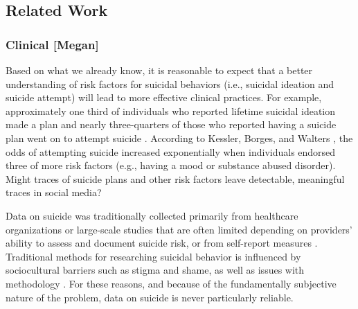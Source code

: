 \documentclass[11pt]{article}
\begin{document}
\begin{comment}
\subsection{Research Questions}
\begin{description}
\item[R1] Using support vector machines trained on primarily linguistic features, can we learn to classify tweets as whether or not they express ideas related to suicide?
\item[R2] Can network structure enhance such classification models?
\item[R3] Can we predict the expression of suicide-related ideas in the future?
\end{description}
\end{comment}

\subsection{Related Work}
\subsubsection{Clinical [Megan]}
Based on what we already know, it is reasonable to expect that a better understanding of risk factors for suicidal behaviors (i.e., suicidal ideation and suicide attempt) will lead to more effective clinical practices. For example, approximately one third of individuals who reported lifetime suicidal ideation made a plan and nearly three-quarters of those who reported having a suicide plan went on to attempt suicide \cite{kessler1999prevalence}. According to Kessler, Borges, and Walters  \cite{kessler1999prevalence}, the odds of attempting suicide increased exponentially when individuals endorsed three of more risk factors (e.g., having a mood or substance abused disorder). Might traces of suicide plans and other risk factors leave detectable, meaningful traces in social media?

Data on suicide was traditionally collected primarily from healthcare organizations or large-scale studies that are often limited depending on providers' ability to assess and document suicide risk, or from self-report measures \cite{crosby2011self,horowitz2009suicide}.  Traditional methods for researching suicidal behavior is influenced by sociocultural barriers such as stigma and shame, as well as issues with methodology \cite{crosby2011self}. For these reasons, and because of the fundamentally subjective nature of the problem, data on suicide is never particularly reliable. 
\end{document}

